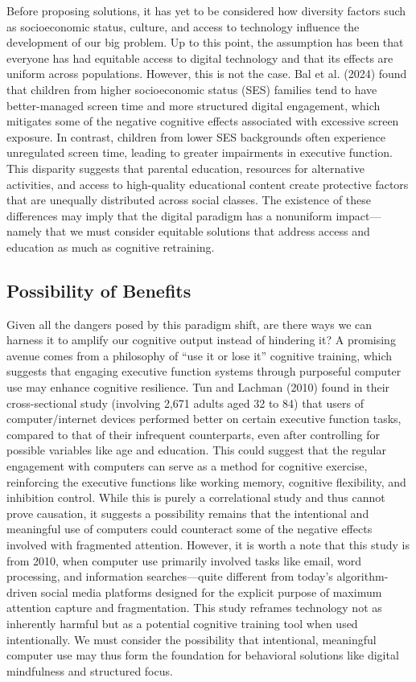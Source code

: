 \documentclass[12pt,letterpaper]{article}
\begin{document}
Before proposing solutions, it has yet to be considered how diversity factors such as socioeconomic status, culture, and access to technology influence the development of our big problem. Up to this point, the assumption has been that everyone has had equitable access to digital technology and that its effects are uniform across populations. However, this is not the case. Bal et al. (2024) found that children from higher socioeconomic status (SES) families tend to have better-managed screen time and more structured digital engagement, which mitigates some of the negative cognitive effects associated with excessive screen exposure. In contrast, children from lower SES backgrounds often experience unregulated screen time, leading to greater impairments in executive function. This disparity suggests that parental education, resources for alternative activities, and access to high-quality educational content create protective factors that are unequally distributed across social classes. The existence of these differences may imply that the digital paradigm has a nonuniform impact---namely that we must consider equitable solutions that address access and education as much as cognitive retraining.

\subsection*{Possibility of Benefits}

Given all the dangers posed by this paradigm shift, are there ways we can harness it to amplify our cognitive output instead of hindering it? A promising avenue comes from a philosophy of ``use it or lose it'' cognitive training, which suggests that engaging executive function systems through purposeful computer use may enhance cognitive resilience. Tun and Lachman (2010) found in their cross-sectional study (involving 2,671 adults aged 32 to 84) that users of computer/internet devices performed better on certain executive function tasks, compared to that of their infrequent counterparts, even after controlling for possible variables like age and education. This could suggest that the regular engagement with computers can serve as a method for cognitive exercise, reinforcing the executive functions like working memory, cognitive flexibility, and inhibition control. While this is purely a correlational study and thus cannot prove causation, it suggests a possibility remains that the intentional and meaningful use of computers could counteract some of the negative effects involved with fragmented attention. However, it is worth a note that this study is from 2010, when computer use primarily involved tasks like email, word processing, and information searches---quite different from today's algorithm-driven social media platforms designed for the explicit purpose of maximum attention capture and fragmentation. This study reframes technology not as inherently harmful but as a potential cognitive training tool when used intentionally. We must consider the possibility that intentional, meaningful computer use may thus form the foundation for behavioral solutions like digital mindfulness and structured focus.
\end{document}
